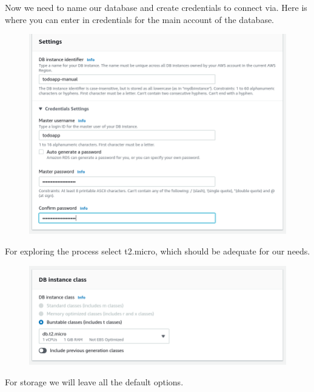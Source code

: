 \documentclass{csse4400}
\begin{document}
Now we need to name our database and create credentials to connect via. Here is where you can enter in credentials for the main account of the database.

\begin{figure}[H]
  \includegraphics[width=\textwidth]{images/db3}
\end{figure}

For exploring the process select t2.micro, which should be adequate for our needs.


\begin{figure}[H]
  \includegraphics[width=\textwidth]{images/db4}
\end{figure}

For storage we will leave all the default options.
\end{document}
